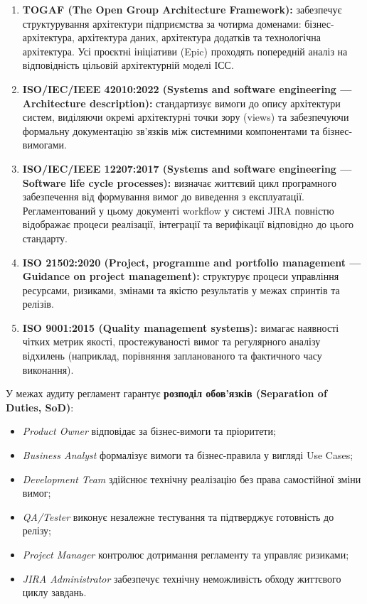 \documentclass{article}
\begin{document}
\begin{enumerate}
    \item \textbf{TOGAF (The Open Group Architecture Framework):} забезпечує структурування архітектури підприємства за чотирма доменами: бізнес-архітектура, архітектура даних, архітектура додатків та технологічна архітектура. Усі проєктні ініціативи (Epic) проходять попередній аналіз на відповідність цільовій архітектурній моделі ІСС.
    \item \textbf{ISO/IEC/IEEE 42010:2022 (Systems and software engineering --- Architecture description):} стандартизує вимоги до опису архітектури систем, виділяючи окремі архітектурні точки зору (views) та забезпечуючи формальну документацію зв'язків між системними компонентами та бізнес-вимогами.
    \item \textbf{ISO/IEC/IEEE 12207:2017 (Systems and software engineering --- Software life cycle processes):} визначає життєвий цикл програмного забезпечення від формування вимог до виведення з експлуатації. Регламентований у цьому документі workflow у системі JIRA повністю відображає процеси реалізації, інтеграції та верифікації відповідно до цього стандарту.
    \item \textbf{ISO 21502:2020 (Project, programme and portfolio management --- Guidance on project management):} структурує процеси управління ресурсами, ризиками, змінами та якістю результатів у межах спринтів та релізів.
    \item \textbf{ISO 9001:2015 (Quality management systems):} вимагає наявності чітких метрик якості, простежуваності вимог та регулярного аналізу відхилень (наприклад, порівняння запланованого та фактичного часу виконання).
\end{enumerate}

У межах аудиту регламент гарантує \textbf{розподіл обов'язків (Separation of Duties, SoD)}:
\begin{itemize}
    \item \emph{Product Owner} відповідає за бізнес-вимоги та пріоритети;
    \item \emph{Business Analyst} формалізує вимоги та бізнес-правила у вигляді Use Cases;
    \item \emph{Development Team} здійснює технічну реалізацію без права самостійної зміни вимог;
    \item \emph{QA/Tester} виконує незалежне тестування та підтверджує готовність до релізу;
    \item \emph{Project Manager} контролює дотримання регламенту та управляє ризиками;
    \item \emph{JIRA Administrator} забезпечує технічну неможливість обходу життєвого циклу завдань.
\end{itemize}
\end{document}
